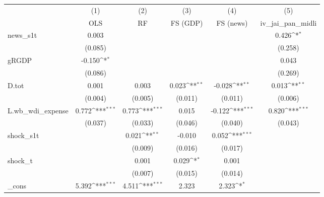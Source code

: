 {
\def\sym#1{\ifmmode^{#1}\else\(^{#1}\)\fi}
\begin{tabular}{l*{5}{c}}
\toprule
            &\multicolumn{1}{c}{(1)}&\multicolumn{1}{c}{(2)}&\multicolumn{1}{c}{(3)}&\multicolumn{1}{c}{(4)}&\multicolumn{1}{c}{(5)}\\
            &\multicolumn{1}{c}{OLS}&\multicolumn{1}{c}{RF}&\multicolumn{1}{c}{FS (GDP)}&\multicolumn{1}{c}{FS (news)}&\multicolumn{1}{c}{iv\_jai\_pan\_midli}\\
\midrule
news\_s1t    &       0.003         &                     &                     &                     &       0.426\sym{*}  \\
            &     (0.085)         &                     &                     &                     &     (0.258)         \\
\addlinespace
gRGDP       &      -0.150\sym{*}  &                     &                     &                     &       0.043         \\
            &     (0.086)         &                     &                     &                     &     (0.269)         \\
\addlinespace
D.tot       &       0.001         &       0.003         &       0.023\sym{**} &      -0.028\sym{**} &       0.013\sym{**} \\
            &     (0.004)         &     (0.005)         &     (0.011)         &     (0.011)         &     (0.006)         \\
\addlinespace
L.wb\_wdi\_expense&       0.772\sym{***}&       0.773\sym{***}&       0.015         &      -0.122\sym{***}&       0.820\sym{***}\\
            &     (0.037)         &     (0.033)         &     (0.046)         &     (0.040)         &     (0.043)         \\
\addlinespace
shock\_s1t   &                     &       0.021\sym{**} &      -0.010         &       0.052\sym{***}&                     \\
            &                     &     (0.009)         &     (0.016)         &     (0.017)         &                     \\
\addlinespace
shock\_t     &                     &       0.001         &       0.029\sym{*}  &       0.001         &                     \\
            &                     &     (0.007)         &     (0.015)         &     (0.014)         &                     \\
\addlinespace
\_cons      &       5.392\sym{***}&       4.511\sym{***}&       2.323         &       2.323\sym{*}  &                     \\

\end{tabular}}
